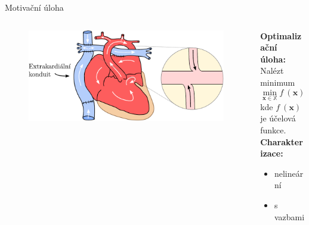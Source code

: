 \documentclass[aspectratio=169,xcolor=dvipsnames]{beamer}
\newcommand{\vect}[1]{\mathbf{#1}}
\begin{document}
\begin{frame}{Motivační úloha}
	\begin{columns}[T] %
		\begin{column}{.63\textwidth}
			\begin{figure}
				\includegraphics[width=0.9\linewidth]{Images/srdce_zoom_cz.pdf}
			\end{figure}
		\end{column}%
		\hfill%
		\begin{column}{.37\textwidth}
			\vspace{0pt}
			\textbf{Optimalizační úloha:}\\
			\vspace{6pt}
			Nalézt minimum
			\begin{equation*}
				\min _{\vect{x} \in \mathbb{X} } f \ (\vect{x}),
			\end{equation*}
			kde $ f \ (\vect{x}) $ je účelová funkce.\\
			\vspace{11pt}
			\textbf{Charakterizace:}\\[2pt]
			\begin{itemize}
				\item nelineární
				\item s vazbami
			\end{itemize}
		\end{column}%
	\end{columns}
\end{frame}

\end{document}
